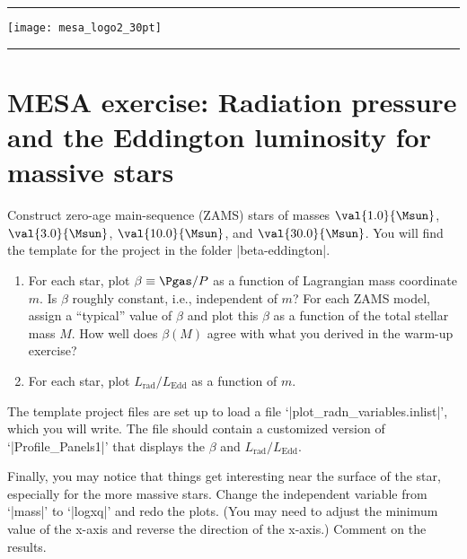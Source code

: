 
\DefineShortVerb{\|}

\newpage

\begin{center}
\rule[10pt]{60pt}{1pt}\texttt{[image: mesa\_logo2\_30pt]}\rule[10pt]{60pt}{1pt}
\end{center}

\section{MESA exercise: Radiation pressure and the Eddington luminosity for massive stars}

Construct zero-age main-sequence (ZAMS) stars of masses $\val{1.0}{\Msun}$, $\val{3.0}{\Msun}$, $\val{10.0}{\Msun}$, and $\val{30.0}{\Msun}$. You will find the template for the project in  the folder |beta-eddington|. 

\begin{enumerate}
\item For each star, plot $\beta\equiv \Pgas/P$ as a function of Lagrangian mass coordinate $m$. Is $\beta$ roughly constant, i.e., independent of $m$? For each ZAMS model, assign a ``typical'' value of $\beta$ and plot this $\beta$ as a function of the total stellar mass $M$.  How well does $\beta(M)$ agree with what you derived in the warm-up exercise?

\item For each star, plot $L_{\mathrm{rad}}/L_{\mathrm{Edd}}$ as a function of $m$.
\end{enumerate}
The template project files are set up to load a file `|plot_radn_variables.inlist|', which you will write.  The file should contain a customized version of `|Profile_Panels1|' that displays the $\beta$ and $L_{\mathrm{rad}}/L_{\mathrm{Edd}}$.

Finally, you may notice that things get interesting near the surface of the star, especially for the more massive stars.  Change the independent variable from `|mass|' to `|logxq|' and redo the plots. (You may need to adjust the minimum value of the x-axis and reverse the direction of the x-axis.) Comment on the results.

\UndefineShortVerb{\|}
